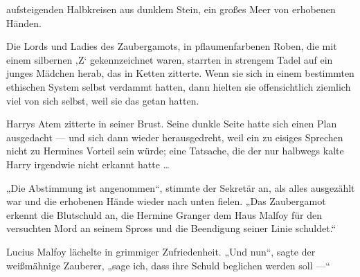 

 aufsteigenden Halbkreisen aus dunklem Stein, ein großes Meer von erhobenen Händen.

\hplettrineextrapara
Die Lords und Ladies des Zaubergamots, in pflaumenfarbenen Roben, die mit einem silbernen ‚Z‘ gekennzeichnet waren, starrten in strengem Tadel auf ein junges Mädchen herab, das in Ketten zitterte. Wenn sie sich in einem bestimmten ethischen System selbst verdammt hatten, dann hielten sie offensichtlich ziemlich viel von sich selbst, weil sie das getan hatten.

Harrys Atem zitterte in seiner Brust. Seine dunkle Seite hatte sich einen Plan ausgedacht — und sich dann wieder herausgedreht, weil ein zu eisiges Sprechen nicht zu Hermines Vorteil sein würde; eine Tatsache, die der nur halbwegs kalte Harry irgendwie nicht erkannt hatte …

„Die Abstimmung ist angenommen“, stimmte der Sekretär an, als alles ausgezählt war und die erhobenen Hände wieder nach unten fielen.
„Das Zaubergamot erkennt die Blutschuld an, die Hermine Granger dem Haus Malfoy für den versuchten Mord an seinem Spross und die Beendigung seiner Linie schuldet.“

Lucius Malfoy lächelte in grimmiger Zufriedenheit.
„Und nun“, sagte der weißmähnige Zauberer, „sage ich, dass ihre Schuld beglichen werden soll —“

